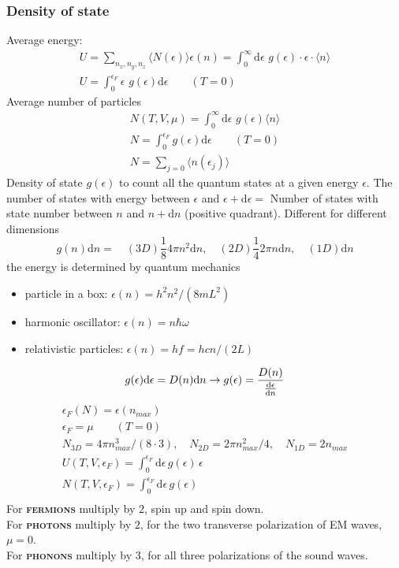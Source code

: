 \documentclass[a4paper, norsk, 8pt]{article}
\begin{document}
\begin{multicols*}{3}
\subsubsection*{\scriptsize  Density of state}
Average energy:
\begin{gather*}
  U = \sum_{n_x,n_y,n_z} \langle N(\epsilon) \rangle \epsilon(n) = \int_{0}^{\infty}\mbox{d}\epsilon\,\, g(\epsilon)\cdot \epsilon \cdot \langle n \rangle \\
  U = \int_0^{\epsilon_F} \epsilon \,\,g(\epsilon) \mbox{d}\epsilon \qquad (T=0)
\end{gather*}
Average number of particles
\begin{gather*}
  N(T,V,\mu) = \int_0^{\infty} \mbox{d}\epsilon\,\, g(\epsilon) \langle n \rangle \\
  N = \int_0^{\epsilon_F} g(\epsilon) \mbox{d}\epsilon \qquad (T=0)\\
  N = \sum_{j=0} \langle n(\epsilon_j) \rangle
\end{gather*}
Density of state $g(\epsilon)$ to count all the quantum states at a given energy $\epsilon$. The number of states with energy between $\epsilon$ and $\epsilon + \mbox{d}\epsilon = $ Number of states with state number between $n$ and $n+\mbox{d}n$ (positive quadrant). Different for different dimensions
\begin{equation*}
  \boxed{g(n) \mbox{d}n=} \quad(3D) \frac{1}{8}4\pi n^2 \mbox{d}n, \quad(2D) \frac{1}{4}2\pi n \mbox{d}n, \quad(1D)\mbox{d}n
\end{equation*}
the energy is determined by quantum mechanics
\begin{itemize}
  \item particle in a box: $\epsilon(n) = h^2n^2/(8mL^2)$
  \item harmonic oscillator: $\epsilon(n) = n\hbar\omega$
  \item relativistic particles: $\epsilon(n) = hf = hcn/(2L)$
\end{itemize}
\begin{equation*}
    g(\epsilon)\mbox{d}\epsilon = D(n)\mbox{d}n \rightarrow g(\epsilon) = \frac{D(n)}{\dv{\epsilon}{n}}
\end{equation*}
\begin{gather*}
  \epsilon_F(N) = \epsilon(n_{max}) \\
  \epsilon_F = \mu \qquad (T=0) \\
  N_{3D} = 4\pi n_{max}^3/(8\cdot 3), \quad N_{2D} = 2\pi n_{max}^2/4, \quad N_{1D} = 2n_{max}\\
  U(T,V,\epsilon_F) = \int_0^{\epsilon_F} \mbox{d}\epsilon \, g(\epsilon)\, \epsilon \\
  N(T,V,\epsilon_F) = \int_0^{\epsilon_F} \mbox{d}\epsilon \, g(\epsilon) \\
\end{gather*}
For \textbf{\textsc{fermions}} multiply by $2$, spin up and spin down.\\
For \textbf{\textsc{photons}} multiply by $2$, for the two transverse polarization of EM waves, $\mu=0$.\\
For \textbf{\textsc{phonons}} multiply by $3$, for all three polarizations of the sound waves.


\end{multicols*}
\end{document}
